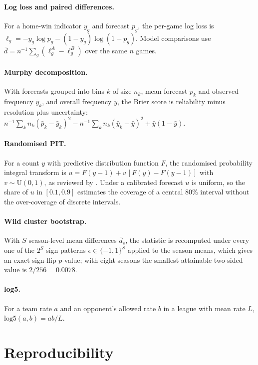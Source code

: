 \paragraph{Log loss and paired differences.}
For a home-win indicator $y_g$ and forecast $p_g$, the per-game log loss is
$\ell_g = -y_g \log p_g - (1 - y_g)\log(1 - p_g)$. Model comparisons use
$\bar d = n^{-1}\sum_g (\ell^{A}_g - \ell^{B}_g)$ over the same $n$ games.

\paragraph{Murphy decomposition.}
With forecasts grouped into bins $k$ of size $n_k$, mean forecast $\bar p_k$ and
observed frequency $\bar y_k$, and overall frequency $\bar y$, the Brier score
is reliability minus resolution plus uncertainty:
$n^{-1}\sum_k n_k(\bar p_k - \bar y_k)^2 - n^{-1}\sum_k n_k(\bar y_k - \bar y)^2
+ \bar y(1 - \bar y)$.

\paragraph{Randomised PIT.}
For a count $y$ with predictive distribution function $F$, the randomised
probability integral transform is $u = F(y-1) + v\,[F(y) - F(y-1)]$ with
$v \sim \mathrm{U}(0, 1)$, as reviewed by \citet{czado2009predictive}. Under a calibrated forecast
$u$ is uniform, so the share of $u$ in $[0.1, 0.9]$ estimates the coverage of a
central 80\% interval without the over-coverage of discrete intervals.

\paragraph{Wild cluster bootstrap.}
With $S$ season-level mean differences $\bar d_s$, the statistic is recomputed
under every one of the $2^S$ sign patterns $\epsilon \in \{-1, 1\}^S$ applied to
the season means, which gives an exact sign-flip $p$-value;
with eight seasons the smallest attainable two-sided value is $2/256 = 0.0078$.

\paragraph{log5.}
For a team rate $a$ and an opponent's allowed rate $b$ in a league with mean
rate $L$, $\mathrm{log5}(a, b) = ab/L$.

\section{Reproducibility}
\label{app:repro}

